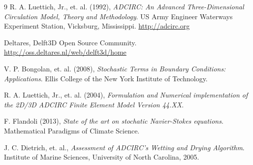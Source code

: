 \documentclass[a4paper, 10pt]{article}
\begin{document}
	\begin{thebibliography}{9}
		R. A. Luettich, Jr., et. al. (1992), \emph{ADCIRC: An Advanced Three-Dimensional Circulation Model, Theory and Methodology}. US Army Engineer Waterways Experiment Station, Vicksburg, Mississippi. \url{http://adcirc.org}
		
		Deltares, Delft3D Open Source Community. \url{http://oss.deltares.nl/web/delft3d/home}
		
		V. P. Bongolan, et. al. (2008), \emph{Stochastic Terms in Boundary Conditions: Applications}. Ellis College of the New York Institute of Technology.
		
		R. A. Luettich, Jr., et. al. (2004), \emph{Formulation and Numerical implementation of the 2D/3D ADCIRC Finite Element Model Version 44.XX}.
		
		F. Flandoli (2013), \emph{State of the art on stochatic Navier-Stokes equations}. Mathematical Paradigms of Climate Science.
		
		J. C. Dietrich, et. al., \emph{Assessment of ADCIRC's Wetting and Drying Algorithm}. Institute of Marine Sciences, University of North Carolina, 2005.
		
	\end{thebibliography}
	
\end{document}
